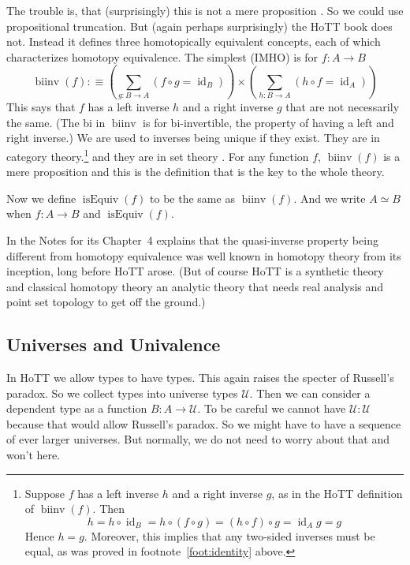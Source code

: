 \documentclass[11pt]{article}
\DeclareMathOperator{\idfun}{id}
\DeclareMathOperator{\binv}{biinv}
\DeclareMathOperator{\isEquiv}{isEquiv}
\newcommand{\universe}{\mathcal{U}}
\begin{document}
The trouble is, that (surprisingly) this is not a mere proposition
.  So we could use propositional
truncation.  But (again perhaps surprisingly) the HoTT book does not.
Instead it defines three homotopically equivalent concepts, each of
which characterizes homotopy equivalence.  The simplest (IMHO) is
for $f : A \to B$
$$
   \binv(f) :\equiv \left( \sum_{g : B \to A} (f \circ g = \idfun_B)\right)
   \times \left( \sum_{h : B \to A} (h \circ f = \idfun_A)\right)
$$
This says that $f$ has a left inverse $h$ and a right inverse $g$ that are
not necessarily the same.
(The bi in $\binv$ is for bi-invertible, the property of having a left and
right inverse.)
We are used to inverses being unique if they exist.
They are in category theory.\footnote{Suppose $f$ has
a left inverse $h$ and a right inverse $g$, as in
the HoTT definition of $\binv(f)$.  Then
$$
   h = h \circ \idfun_B = h \circ (f \circ g)
   = (h \circ f) \circ g = \idfun_A g = g
$$
Hence $h = g$.  Moreover, this implies that any two-sided inverses must
be equal, as was proved in footnote~\ref{foot:identity} above.}
and they are in set theory .
For any function $f$, $\binv(f)$ is a mere proposition
 and this is the definition that is the
key to the whole theory.

Now we define $\isEquiv(f)$ to be the same as $\binv(f)$.  And we
write $A \simeq B$ when $f : A \to B$ and $\isEquiv(f)$.

In the Notes for its Chapter~4  explains that
the quasi-inverse property being different from homotopy
equivalence was well known in homotopy theory from its inception, long
before HoTT arose.  (But of course HoTT is a synthetic theory and classical
homotopy theory an analytic theory that needs real analysis and point set
topology to get off the ground.)

\subsection{Universes and Univalence}
\label{sec:univalence}

In HoTT we allow types to have types.  This again raises the specter of
Russell's paradox.  So we collect types into universe types $\universe$.
Then we can
consider a dependent type as a function $B : A \to \universe$.
To be careful we cannot have $\universe : \universe$ because that
would allow Russell's paradox.  So we might have to have a sequence of
ever larger universes.  But normally, we do not need to worry about that
 and won't here.
\end{document}
